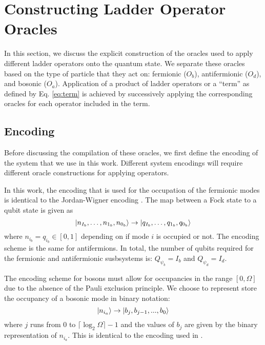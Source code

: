\section{Constructing Ladder Operator Oracles}
\label{sec:ladder-op-oracles}

In this section, we discuss the explicit construction of the oracles used to apply different ladder operators onto the quantum state.
We separate these oracles based on the type of particle that they act on: fermionic ($O_b$), antifermionic ($O_d$), and bosonic ($O_a$).
Application of a product of ladder operators or a ``term'' as defined by Eq. \ref{eq:term} is achieved by successively applying the corresponding oracles for each operator included in the term.   

\subsection{Encoding}
\label{subsec:encoding}

Before discussing the compilation of these oracles, we first define the encoding of the system that we use in this work.
Different system encodings will require different oracle constructions for applying operators.

In this work, the encoding that is used for the occupation of the fermionic modes is identical to the Jordan-Wigner encoding \cite{jordan-wigner}.
The map between a Fock state to a qubit state is given as 
\begin{equation}
    \ket{n_{I_b}, \dots, n_{1_b}, n_{0_b}} \rightarrow \ket{q_{I_b}, \dots, q_{1_b}, q_{0_b}}
\end{equation}
where $n_{i_b} = q_{i_b} \in [0, 1]$ depending on if mode $i$ is occupied or not.
The encoding scheme is the same for antifermions.
In total, the number of qubits required for the fermionic and antifermionic susbsystems is: $Q_{\psi_b} = I_b$ and $Q_{\psi_d} = I_d$.

The encoding scheme for bosons must allow for occupancies in the range $[0, \Omega]$ due to the absence of the Pauli exclusion principle.
We choose to represent store the occupancy of a bosonic mode in binary notation: 
\begin{equation}
    \ket{n_{i_a}} \rightarrow \ket{b_j, b_{j-1}, ..., b_0}
\end{equation}
where $j$ runs from $0$ to $\lceil \log_2{\Omega} \rceil - 1$ and the values of $b_j$ are given by the binary representation of $n_{i_a}$.
This is identical to the encoding used in \cite{rhodes2024exponential}. 

